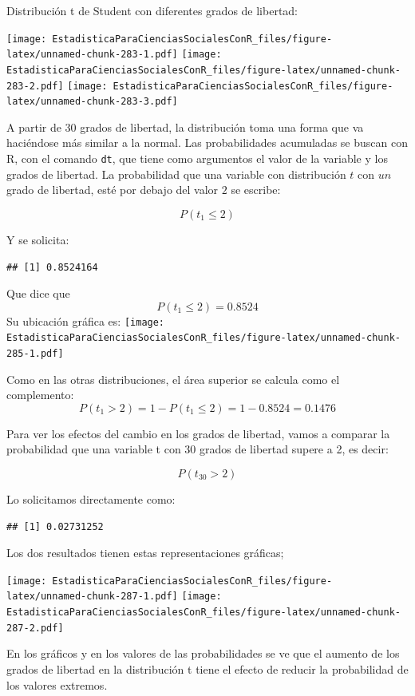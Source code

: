 \documentclass[]{book}
\begin{document}
Distribución t de Student con diferentes grados de libertad:

\texttt{[image: EstadisticaParaCienciasSocialesConR\_files/figure-latex/unnamed-chunk-283-1.pdf]} \texttt{[image: EstadisticaParaCienciasSocialesConR\_files/figure-latex/unnamed-chunk-283-2.pdf]} \texttt{[image: EstadisticaParaCienciasSocialesConR\_files/figure-latex/unnamed-chunk-283-3.pdf]}

A partir de 30 grados de libertad, la distribución toma una forma que va haciéndose más similar a la normal. Las probabilidades acumuladas se
buscan con R, con el comando \texttt{dt}, que tiene como argumentos el
valor de la variable y los grados de libertad. La probabilidad que una variable con distribución \(t\) con \(un\) grado de libertad, esté por debajo del valor \(2\) se escribe:

\[P(t_{1} \leq 2)\]

Y se solicita:

\begin{verbatim}
## [1] 0.8524164
\end{verbatim}

Que dice que \[P(t_{1} \leq 2)=0.8524\]
Su ubicación gráfica es:
\texttt{[image: EstadisticaParaCienciasSocialesConR\_files/figure-latex/unnamed-chunk-285-1.pdf]}

Como en las otras distribuciones, el área superior se calcula como el complemento: \[P(t_{1} > 2)=1-P(t_{1}\leq2)=1-0.8524=0.1476\]

Para ver los efectos del cambio en los grados de libertad, vamos a
comparar la probabilidad que una variable t con 30 grados de libertad
supere a 2, es decir:

\[P(t_{30} > 2)\]

Lo solicitamos directamente como:

\begin{verbatim}
## [1] 0.02731252
\end{verbatim}

Los dos resultados tienen estas representaciones gráficas;

\texttt{[image: EstadisticaParaCienciasSocialesConR\_files/figure-latex/unnamed-chunk-287-1.pdf]} \texttt{[image: EstadisticaParaCienciasSocialesConR\_files/figure-latex/unnamed-chunk-287-2.pdf]}

En los gráficos y en los valores de las probabilidades se ve que el
aumento de los grados de libertad en la distribución t tiene el efecto
de reducir la probabilidad de los valores extremos.
\end{document}
